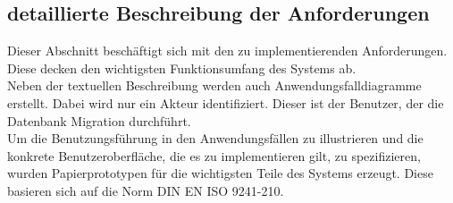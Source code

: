 \subsection{detaillierte Beschreibung der Anforderungen}
Dieser Abschnitt beschäftigt sich mit den zu implementierenden Anforderungen. Diese decken den wichtigsten Funktionsumfang des Systems ab.\\
Neben der textuellen Beschreibung werden auch Anwendungsfalldiagramme erstellt. Dabei wird nur ein Akteur identifiziert. Dieser ist der Benutzer, der die Datenbank Migration durchführt. \\
Um die Benutzungsführung in den Anwendungsfällen zu illustrieren und die konkrete Benutzeroberfläche, die es zu implementieren gilt, zu spezifizieren, wurden Papierprototypen für die wichtigsten Teile des Systems erzeugt. Diese basieren sich auf die Norm DIN EN ISO 9241-210.




